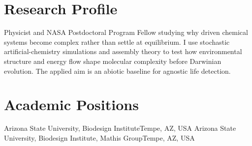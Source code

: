 \documentclass{cv}
\begin{document}
\nocite{*}

\makecvheader


\section{Research Profile}
Physicist and NASA Postdoctoral Program Fellow studying why driven chemical systems become complex rather than settle at equilibrium.
I use stochastic artificial-chemistry simulations and assembly theory to test how environmental structure and energy flow shape molecular complexity before Darwinian evolution.
The applied aim is an abiotic baseline for agnostic life detection.

\section{Academic Positions}
\begin{cvitems}
        {Arizona State University, Biodesign Institute}{Tempe, AZ, USA}
        {Arizona State University, Biodesign Institute, Mathis Group}{Tempe, AZ, USA}
\end{cvitems}

\end{document}
